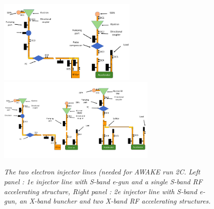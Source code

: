 \documentclass[12pt]{amsart}
\begin{document}
 
\begin{figure}[htbp] %
   \centering
   \includegraphics[height=1.6in]{im/layout1e.png} 
   \includegraphics[height=1.6in]{im/layout2e.png} 
   \caption{\em The two electron injector lines (needed for AWAKE run 2C.
   	Left panel : 1e injector line with S-band e-gun and a single S-band RF accelerating structure,
   	Right panel : 2e injector line with S-band e-gun, an X-band buncher and two X-band RF accelerating structures.
    }
   \label{fig:elinac}
\end{figure}
\end{document}
